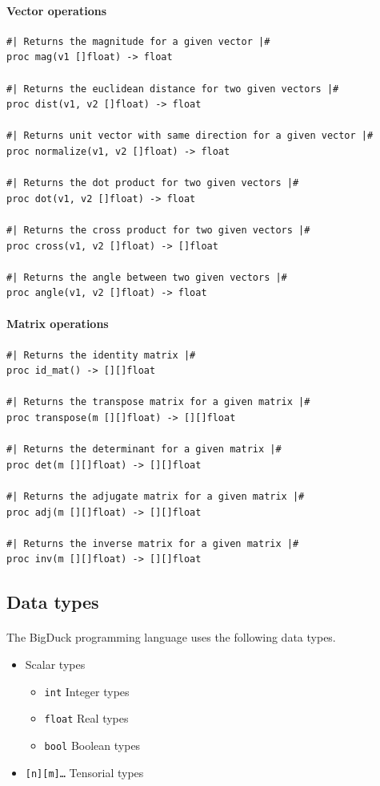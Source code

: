 \documentclass[12pt, titlepage]{article}
\begin{document}
\paragraph{Vector operations}
\begin{verbatim}
#| Returns the magnitude for a given vector |#
proc mag(v1 []float) -> float

#| Returns the euclidean distance for two given vectors |#
proc dist(v1, v2 []float) -> float

#| Returns unit vector with same direction for a given vector |#
proc normalize(v1, v2 []float) -> float

#| Returns the dot product for two given vectors |#
proc dot(v1, v2 []float) -> float

#| Returns the cross product for two given vectors |#
proc cross(v1, v2 []float) -> []float

#| Returns the angle between two given vectors |#
proc angle(v1, v2 []float) -> float
\end{verbatim}

\paragraph{Matrix operations}
\begin{verbatim}
#| Returns the identity matrix |#
proc id_mat() -> [][]float

#| Returns the transpose matrix for a given matrix |#
proc transpose(m [][]float) -> [][]float

#| Returns the determinant for a given matrix |#
proc det(m [][]float) -> [][]float

#| Returns the adjugate matrix for a given matrix |#
proc adj(m [][]float) -> [][]float

#| Returns the inverse matrix for a given matrix |#
proc inv(m [][]float) -> [][]float

\end{verbatim}

\newpage

\subsection{Data types}
\paragraph{} The BigDuck programming language uses the following data types.
\begin{itemize}
    \item Scalar types
    \begin{itemize}
        \item \texttt{int} Integer types
        \item \texttt{float} Real types
        \item \texttt{bool} Boolean types
    \end{itemize}
    \item \texttt{[n][m]\dots <scalar type>} Tensorial types
\end{itemize}
\end{document}
